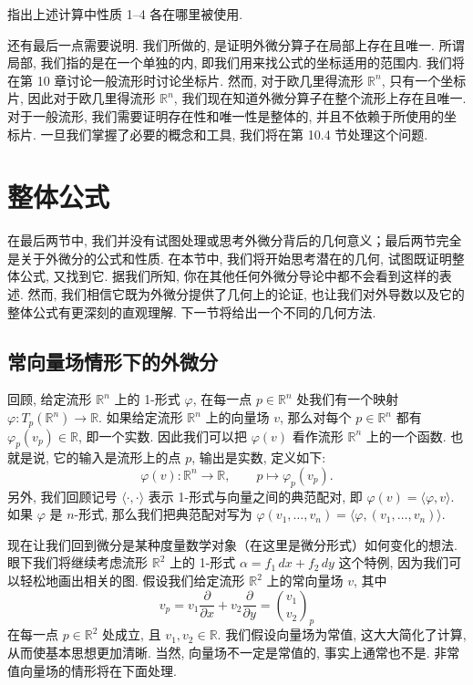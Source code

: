 \begin{question}\label{q:4-4}
指出上述计算中性质 1--4 各在哪里被使用.
\end{question}

还有最后一点需要说明. 我们所做的, 是证明外微分算子在局部上存在且唯一. 所谓局部, 我们指的是在一个单独的内, 即我们用来找公式的坐标适用的范围内. 我们将在第 10 章讨论一般流形时讨论坐标片. 然而, 对于欧几里得流形 $\mathbb{R}^n$, 只有一个坐标片, 因此对于欧几里得流形 $\mathbb{R}^n$, 我们现在知道外微分算子在整个流形上存在且唯一. 对于一般流形, 我们需要证明存在性和唯一性是整体的, 并且不依赖于所使用的坐标片. 一旦我们掌握了必要的概念和工具, 我们将在第 10.4 节处理这个问题.

\section{整体公式}

在最后两节中, 我们并没有试图处理或思考外微分背后的几何意义；最后两节完全是关于外微分的公式和性质. 在本节中, 我们将开始思考潜在的几何, 试图既证明整体公式, 又找到它. 据我们所知, 你在其他任何外微分导论中都不会看到这样的表述. 然而, 我们相信它既为外微分提供了几何上的论证, 也让我们对外导数以及它的整体公式有更深刻的直观理解. 下一节将给出一个不同的几何方法.

\subsection{常向量场情形下的外微分}

回顾, 给定流形 $\mathbb{R}^n$ 上的 1-形式 $\varphi$, 在每一点 $p\in\mathbb{R}^n$ 处我们有一个映射 $\varphi:T_p(\mathbb{R}^n)\to\mathbb{R}$. 如果给定流形 $\mathbb{R}^n$ 上的向量场 $v$, 那么对每个 $p\in\mathbb{R}^n$ 都有 $\varphi_p(v_p)\in\mathbb{R}$, 即一个实数. 因此我们可以把 $\varphi(v)$ 看作流形 $\mathbb{R}^n$ 上的一个函数. 也就是说, 它的输入是流形上的点 $p$, 输出是实数, 定义如下: 
\[
\varphi(v):\mathbb{R}^n\to\mathbb{R},\qquad p\longmapsto\varphi_p(v_p).
\]
另外, 我们回顾记号 $\langle\cdot,\cdot\rangle$ 表示 1-形式与向量之间的典范配对, 即 $\varphi(v)=\langle\varphi,v\rangle$. 如果 $\varphi$ 是 $n$-形式, 那么我们把典范配对写为 $\varphi(v_1,\ldots,v_n)=\bigl\langle\varphi,(v_1,\ldots,v_n)\bigr\rangle$.

现在让我们回到微分是某种度量数学对象（在这里是微分形式）如何变化的想法. 眼下我们将继续考虑流形 $\mathbb{R}^2$ 上的 1-形式 $\alpha=f_1\,dx+f_2\,dy$ 这个特例, 因为我们可以轻松地画出相关的图. 假设我们给定流形 $\mathbb{R}^2$ 上的常向量场 $v$, 其中
\[
v_p=v_1\frac{\partial}{\partial x}+v_2\frac{\partial}{\partial y}=\binom{v_1}{v_2}_{\!p}
\]
在每一点 $p\in\mathbb{R}^2$ 处成立, 且 $v_1,v_2\in\mathbb{R}$. 我们假设向量场为常值, 这大大简化了计算, 从而使基本思想更加清晰. 当然, 向量场不一定是常值的, 事实上通常也不是. 非常值向量场的情形将在下面处理.

